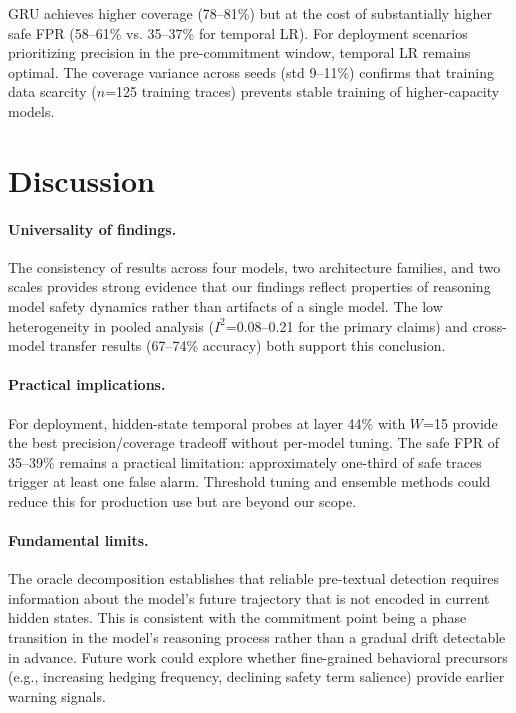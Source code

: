 \documentclass[11pt,a4paper]{article}
\begin{document}
GRU achieves higher coverage (78--81\%) but at the cost of substantially higher safe FPR (58--61\% vs. 35--37\% for temporal LR). For deployment scenarios prioritizing precision in the pre-commitment window, temporal LR remains optimal. The coverage variance across seeds (std 9--11\%) confirms that training data scarcity ($n$=125 training traces) prevents stable training of higher-capacity models.

\section{Discussion}

\paragraph{Universality of findings.}
The consistency of results across four models, two architecture families, and two scales provides strong evidence that our findings reflect properties of reasoning model safety dynamics rather than artifacts of a single model. The low heterogeneity in pooled analysis ($I^2$=0.08--0.21 for the primary claims) and cross-model transfer results (67--74\% accuracy) both support this conclusion.

\paragraph{Practical implications.}
For deployment, hidden-state temporal probes at layer 44\% with $W$=15 provide the best precision/coverage tradeoff without per-model tuning. The safe FPR of 35--39\% remains a practical limitation: approximately one-third of safe traces trigger at least one false alarm. Threshold tuning and ensemble methods could reduce this for production use but are beyond our scope.

\paragraph{Fundamental limits.}
The oracle decomposition establishes that reliable pre-textual detection requires information about the model's future trajectory that is not encoded in current hidden states. This is consistent with the commitment point being a phase transition in the model's reasoning process rather than a gradual drift detectable in advance. Future work could explore whether fine-grained behavioral precursors (e.g., increasing hedging frequency, declining safety term salience) provide earlier warning signals.
\end{document}
